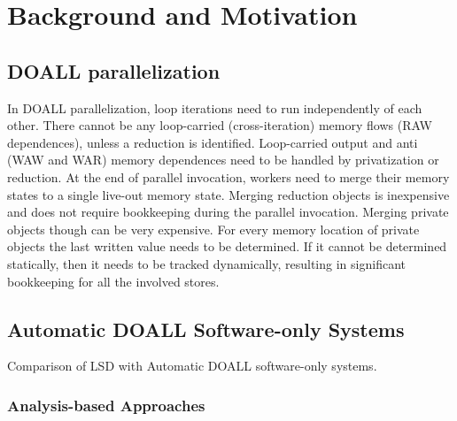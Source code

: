 \section{Background and Motivation}
\label{sec:motivation}

\subsection{DOALL parallelization}

In DOALL parallelization, loop iterations need to run independently of each
other.
%
There cannot be any loop-carried (cross-iteration) memory flows (RAW
dependences), unless a reduction is identified. Loop-carried output and anti
(WAW and WAR) memory dependences need to be handled by privatization or
reduction. At the end of parallel invocation, workers need to merge their memory
states to a single live-out memory state.  Merging reduction objects is
inexpensive and does not require bookkeeping during the parallel invocation.
Merging private objects though can be very expensive. For every memory location
of private objects the last written value needs to be determined. If it cannot
be determined statically, then it needs to be tracked dynamically, resulting in
significant bookkeeping for all the involved stores.

\subsection{Automatic DOALL Software-only Systems}

\begin{table}
  
  \caption{
    Comparison of LSD with Automatic DOALL software-only systems.
  }
  \label{tab:related-work}
    \vspace{-5pt}
\end{table}


\subsubsection{Analysis-based Approaches}

